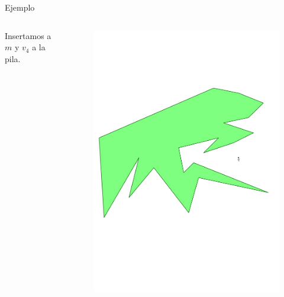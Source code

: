 \documentclass[aspectratio=169,xcolor=dvipsnames, t]{beamer}
\begin{document}
\begin{frame}{Ejemplo}
  \begin{columns}
    \begin{column}{0.3\textwidth}
      \raggedright %
      Insertamos a $m$ y $v_{4}$ a la pila.
    \end{column}
    \begin{column}{0.7\textwidth}
      \vspace{-2.5cm} %
      \begin{figure}
        \centering
        \includegraphics[width=1\linewidth, height=.95\textheight, page=16, keepaspectratio]{IPE/point_visibility.pdf}
      \end{figure}
    \end{column}
  \end{columns}
\end{frame}
\end{document}
